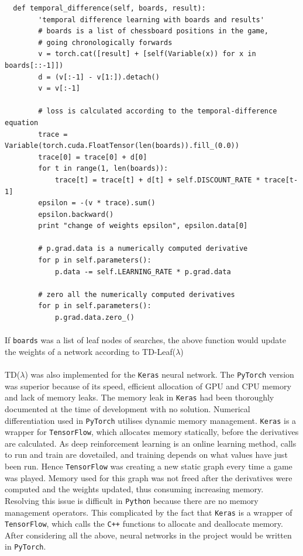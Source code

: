 \documentclass[12pt,a4paper]{book}
\begin{document}
\begin{verbatim}
  def temporal_difference(self, boards, result):
        'temporal difference learning with boards and results'
        # boards is a list of chessboard positions in the game,
        # going chronologically forwards
        v = torch.cat([result] + [self(Variable(x)) for x in boards[::-1]])
        d = (v[:-1] - v[1:]).detach()
        v = v[:-1]
        
        # loss is calculated according to the temporal-difference equation
        trace = Variable(torch.cuda.FloatTensor(len(boards)).fill_(0.0))
        trace[0] = trace[0] + d[0]
        for t in range(1, len(boards)):
            trace[t] = trace[t] + d[t] + self.DISCOUNT_RATE * trace[t-1]
        epsilon = -(v * trace).sum()
        epsilon.backward()
        print "change of weights epsilon", epsilon.data[0]
        
        # p.grad.data is a numerically computed derivative
        for p in self.parameters():
            p.data -= self.LEARNING_RATE * p.grad.data
            
        # zero all the numerically computed derivatives
        for p in self.parameters():
            p.grad.data.zero_()
\end{verbatim}

\paragraph{} If \texttt{boards} was a list of leaf nodes of searches, the above function would update the weights of a network according to TD-Leaf($\lambda$)

\paragraph{} TD($\lambda$) was also implemented for the \texttt{Keras} neural network. The \texttt{PyTorch} version was superior because of its speed, efficient allocation of GPU and CPU memory and lack of memory leaks. The memory leak in \texttt{Keras} had been thoroughly documented at the time of development with no solution. Numerical differentiation used in \texttt{PyTorch} utilises dynamic memory management. \texttt{Keras} is a wrapper for \texttt{TensorFlow}, which allocates memory statically, before the derivatives are calculated. As deep reinforcement learning is an online learning method, calls to run and train are dovetailed, and training depends on what values have just been run. Hence \texttt{TensorFlow} was creating a new static graph every time a game was played. Memory used for this graph was not freed after the derivatives were computed and the weights updated, thus consuming increasing memory. Resolving this issue is difficult in \texttt{Python} because there are no memory management operators. This complicated by the fact that \texttt{Keras} is a wrapper of \texttt{TensorFlow}, which calls the \texttt{C++} functions to allocate and deallocate memory. \cite{tensorflow} After considering all the above, neural networks in the project would be written in \texttt{PyTorch}.
\end{document}
